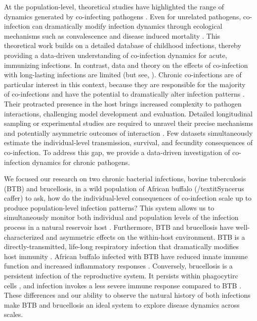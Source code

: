 \documentclass[10pt,letterpaper]{article}
\begin{document}
At the population-level, theoretical studies have highlighted the range of dynamics generated by co-infecting pathogens \cite{abu-raddad_impact_2004, abu-raddad_dual_2006, cummings_dynamic_2005}. Even for unrelated pathogens, co-infection can dramatically modify infection dynamics through ecological mechanisms such as convalescence and disease induced mortality \cite{huang_dynamical_2005, huang_age-structured_2006, rohani_population_1998, rohani_ecological_2003, vasco_tracking_2007}. This theoretical work builds on a detailed database of childhood infections, thereby providing a data-driven understanding of co-infection dynamics for acute, immunizing infections. In contrast, data and theory on the effects of co-infection with long-lasting infections are limited  (but see, \cite{lloyd-smith_hiv-1/parasite_2008}). Chronic co-infections are of particular interest in this context, because they are responsible for the majority of co-infections \cite{griffiths_nature_2011} and have the potential to dramatically alter infection patterns \cite{martcheva_role_2006}. Their protracted presence in the host brings increased complexity to pathogen interactions, challenging model development and evaluation. Detailed longitudinal sampling or experimental studies are required to unravel their precise mechanisms and potentially asymmetric outcomes of interaction \cite{lloyd-smith_hiv-1/parasite_2008}. Few datasets simultaneously estimate the individual-level transmission, survival, and fecundity consequences of co-infection. To address this gap, we provide a data-driven investigation of co-infection dynamics for chronic pathogens.

We focused our research on two chronic bacterial infections, bovine tuberculosis (BTB) and brucellosis, in a wild population of African buffalo (/textit{Syncerus caffer}) to ask, how do the individual-level consequences of co-infection scale up to produce population-level infection patterns? This system allows us to simultaneously monitor both individual and population levels of the infection process \cite{beechler_enemies_2015, ezenwa_opposite_2015} in a natural reservoir host \cite{gomo_survey_2012, michel_mycobacterium_2010}. Furthermore, BTB and brucellosis have well-characterized and asymmetric effects on the within-host environment. BTB is a directly-transmitted, life-long respiratory infection that dramatically modifies host immunity \cite{waters_tuberculosis_2011}. African buffalo infected with BTB have reduced innate immune function and increased inflammatory responses \cite{beechler_enemies_2015}. Conversely, brucellosis is a persistent infection of the reproductive system. It persists within phagocytirc cells \cite{roop_survival_2009}, and infection invokes a less severe immune response compared to BTB \cite{Ko_molecular_2003}. These differences and our ability to observe the natural history of both infections make BTB and brucellosis an ideal system to explore disease dynamics across scales.
\end{document}
